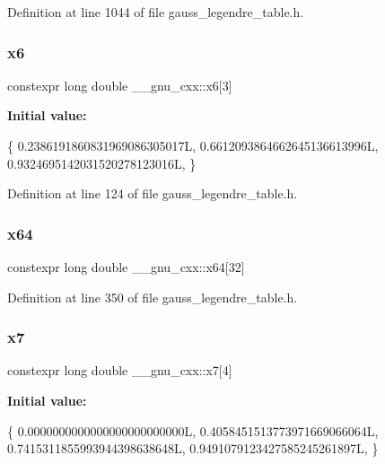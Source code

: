 Definition at line 1044 of file gauss\+\_\+legendre\+\_\+table.\+h.

\mbox{\label{namespace____gnu__cxx_ae1c9116023ca718e1eb7b2ab333c8d2c}} 
\subsubsection{\texorpdfstring{x6}{x6}}
{\footnotesize\ttfamily constexpr long double \+\_\+\+\_\+gnu\+\_\+cxx\+::x6\mbox{[}3\mbox{]}}

{\bfseries Initial value\+:}
\begin{DoxyCode}
\{
    0.2386191860831969086305017L,
    0.6612093864662645136613996L,
    0.9324695142031520278123016L,
  \}
\end{DoxyCode}


Definition at line 124 of file gauss\+\_\+legendre\+\_\+table.\+h.

\mbox{\label{namespace____gnu__cxx_a06387c8c35c954980122bd426c11ed55}} 
\subsubsection{\texorpdfstring{x64}{x64}}
{\footnotesize\ttfamily constexpr long double \+\_\+\+\_\+gnu\+\_\+cxx\+::x64\mbox{[}32\mbox{]}}



Definition at line 350 of file gauss\+\_\+legendre\+\_\+table.\+h.

\mbox{\label{namespace____gnu__cxx_a0e46aeba235d10d7b235b1ece99d0298}} 
\subsubsection{\texorpdfstring{x7}{x7}}
{\footnotesize\ttfamily constexpr long double \+\_\+\+\_\+gnu\+\_\+cxx\+::x7\mbox{[}4\mbox{]}}

{\bfseries Initial value\+:}
\begin{DoxyCode}
\{
    0.0000000000000000000000000L,
    0.4058451513773971669066064L,
    0.7415311855993944398638648L,
    0.9491079123427585245261897L,
  \}
\end{DoxyCode}



